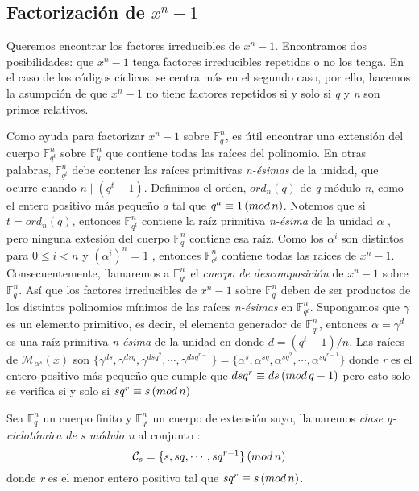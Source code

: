 \subsection{Factorización de $x^n-1$ }
Queremos encontrar los factores irreducibles de $x^n-1$. Encontramos dos posibilidades: que $x^n-1$ tenga factores irreducibles repetidos o no los tenga. En el caso de los códigos cíclicos, se centra más en el segundo caso, por ello, hacemos la asumpción de que $x^n-1$ no tiene factores repetidos si y solo si \textit{q} y \textit{n} son primos relativos.

Como ayuda para factorizar $x^n-1$ sobre $\mathbb{F}_q^n$, es útil encontrar una extensión del cuerpo $\mathbb{F}_{q^t}^n$ sobre $\mathbb{F}_q^n$ que contiene todas las raíces del polinomio. En otras palabras, $\mathbb{F}_{q^t}^n$ debe contener las raíces primitivas \textit{n-ésimas} de la unidad, que ocurre cuando $ n \mid (q^t-1)$.  Definimos el orden, $ord_n(q)$ de \textit{q} módulo \textit{n}, como el entero positivo más pequeño \textit{a} tal que $q^a \equiv 1 \thinspace ( mod \thinspace n)$. Notemos que si $t = ord_n(q)$, entonces $\mathbb{F}_{q^t}^n$ contiene la raíz primitiva \textit{n-ésima} de la unidad $\alpha$ , pero ninguna extesión del cuerpo $\mathbb{F}_q^n$ contiene esa raíz. Como los $\alpha^i$ son distintos para $0 \leq i < n $ y $(\alpha^i)^n = 1$ , entonces $\mathbb{F}_{q^t}^n$ contiene todas las raíces de $x^n-1$. Consecuentemente, llamaremos a $\mathbb{F}_{q^t}^n$ el \textit{cuerpo de descomposición} de $x^n-1$ sobre $\mathbb{F}_q^n$. Así que los factores irreducibles de $x^n-1$ sobre $\mathbb{F}_q^n$ deben de ser productos de los distintos polinomios mínimos de las raíces \textit{n-ésimas} en $\mathbb{F}_{q^t}^n$.  Supongamos que $\gamma$ es un elemento primitivo, es decir, el elemento generador de $\mathbb{F}_{q^t}^n$, entonces $\alpha = \gamma^d$ es una raíz primitiva \textit{n-ésima} de la unidad en donde $d = (q^t-1)/n$. Las raíces de $\mathcal{M}_{\alpha^s}(x)$ son $\{ \gamma^{ds}, \gamma^{dsq},\gamma^{dsq^2} ,\cdots, \gamma^{dsq^{r-1}} \} = \{ \alpha^s,\alpha^{sq},\alpha^{sq^2},\cdots,\alpha^{sq^{r-1}} \}$ donde \textit{r} es el entero positivo más pequeño que cumple que $dsq^r \equiv ds \thinspace ( mod \thinspace q-1 )$ pero esto solo se verifica si y solo si $sq^r \equiv s \thinspace ( mod \thinspace n )$


\begin{definition}
Sea $\mathbb{F}_q^n$ un cuerpo finito y $\mathbb{F}_{q^t}^n$ un cuerpo de extensión suyo, llamaremos \textit{clase q-ciclotómica de s módulo n} al conjunto :
\[
	\mathcal{C}_s = \{s,sq,\cdots,sq^{r-1} \} \thinspace (mod \thinspace n)
\]
donde \textit{r} es el menor entero positivo tal que $sq^r \equiv s \thinspace (mod \thinspace n ) $.
\end{definition}

